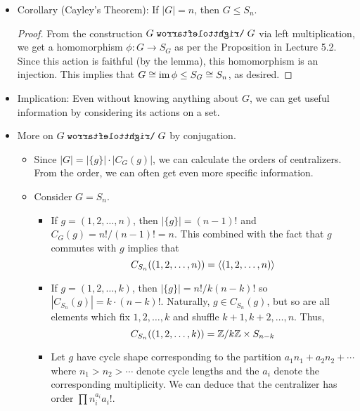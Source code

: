 \documentclass[../notes.tex]{subfiles}
\begin{document}
\begin{itemize}
\begin{proof}
        \begin{align*}
            g\cdot x &= x\\
            gx &= ex\\
            g &= e
        \end{align*}
        for all $g\in\Stab(x)$.
    \end{proof}
    \item Corollary (Cayley's Theorem): If $|G|=n$, then $G\leq S_n$.
    \begin{proof}
        From the construction $G\acts G$ via left multiplication, we get a homomorphism $\phi:G\to S_G$ as per the Proposition in Lecture 5.2. Since this action is faithful (by the lemma), this homomorphism is an injection. This implies that $G\cong\operatorname{im}\phi\leq S_G\cong S_n$, as desired.
    \end{proof}
    \item Implication: Even without knowing anything about $G$, we can get useful information by considering its actions on a set.
    \item More on $G\acts G$ by conjugation.
    \begin{itemize}
        \item Since $|G|=|\{g\}|\cdot|C_G(g)|$, we can calculate the orders of centralizers. From the order, we can often get even more specific information.
        \item Consider $G=S_n$.
        \begin{itemize}
            \item If $g=(1,2,\dots,n)$, then $|\{g\}|=(n-1)!$ and $C_G(g)=n!/(n-1)!=n$. This combined with the fact that $g$ commutes with $g$ implies that
            \begin{equation*}
                C_{S_n}((1,2,\dots,n)) = \left\langle{(1,2,\dots,n)}\right\rangle
            \end{equation*}
            \item If $g=(1,2,\dots,k)$, then $|\{g\}|=n!/k(n-k)!$ so $|C_{S_n}(g)|=k\cdot(n-k)!$. Naturally, $g\in C_{S_n}(g)$, but so are all elements which fix $1,2,\dots,k$ and shuffle $k+1,k+2,\dots,n$. Thus,
            \begin{equation*}
                C_{S_n}((1,2,\dots,k)) = \mathbb{Z}/k\mathbb{Z}\times S_{n-k}
            \end{equation*}
            \item Let $g$ have cycle shape corresponding to the partition $a_1n_1+a_2n_2+\cdots$ where $n_1>n_2>\cdots$ denote cycle lengths and the $a_i$ denote the corresponding multiplicity. We can deduce that the centralizer has order $\prod n_i^{a_i}a_i!$.\par

\end{itemize}
\end{itemize}
\end{itemize}
\end{document}

